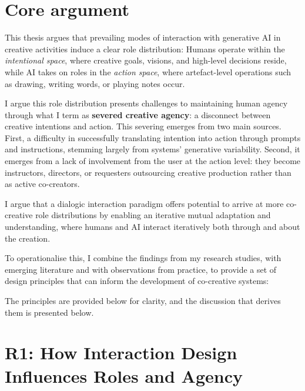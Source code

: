 \section{Core argument}

This thesis argues that prevailing modes of interaction with generative AI in creative activities induce a clear role distribution: Humans operate within the \textit{intentional space}, where creative goals, visions, and high-level decisions reside, while AI takes on roles in the \textit{action space}, where artefact-level operations such as drawing, writing words, or playing notes occur.

I argue this role distribution presents challenges to maintaining human agency through what I term as \textbf{severed creative agency}: a disconnect between creative intentions and action. This severing emerges from two main sources. First, a difficulty in successfully translating intention into action through prompts and instructions, stemming largely from systems' generative variability. Second, it emerges from a lack of involvement from the user at the action level: they become instructors, directors, or requesters outsourcing creative production rather than as active co-creators.

I argue that a dialogic interaction paradigm offers potential to arrive at more co-creative role distributions by enabling an iterative mutual adaptation and understanding, where humans and AI interact iteratively both through and about the creation.

To operationalise this, I combine the findings from my research studies, with emerging literature and with observations from practice, to provide a set of design principles that can inform the development of co-creative systems:

The principles are provided below for clarity, and the discussion that derives them is presented below.


\section{R1: How Interaction Design Influences Roles and Agency}

